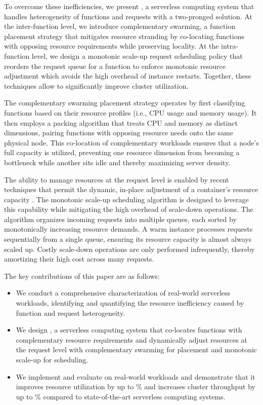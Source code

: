 To overcome these inefficiencies, we present \sysname, a serverless computing system that handles heterogeneity of functions and requests with a two-pronged solution. At the inter-function level, we introduce complementary swarming, a function placement strategy that mitigates resource stranding by co-locating functions with opposing resource requirements while preserving locality. At the intra-function level, we design a monotonic scale-up request scheduling policy that reorders the request queue for a function to enforce monotonic resource adjustment which avoids the high overhead of instance restarts. Together, these techniques allow \sysname to significantly improve cluster utilization.

The complementary swarming placement strategy operates by first classifying functions based on their resource profiles (i.e., CPU usage and memory usage). It then employs a packing algorithm that treats CPU and memory as distinct dimensions, pairing functions with opposing resource needs onto the same physical node. This co-location of complementary workloads ensures that a node's full capacity is utilized, preventing one resource dimension from becoming a bottleneck while another sits idle and thereby maximizing server density.

The ability to manage resources at the request level is enabled by recent techniques that permit the dynamic, in-place adjustment of a container's resource capacity . The monotonic scale-up scheduling algorithm is designed to leverage this capability while mitigating the high overhead of scale-down operations. The algorithm organizes incoming requests into multiple queues, each sorted by monotonically increasing resource demands. A warm instance processes requests sequentially from a single queue, ensuring its resource capacity is almost always scaled up. Costly scale-down operations are only performed infrequently, thereby amortizing their high cost across many requests.

The key contributions of this paper are as follows:
\begin{itemize}
    \item We conduct a comprehensive characterization of real-world serverless workloads, identifying and quantifying the resource inefficiency caused by function and request heterogeneity.
    \item We design \sysname, a serverless computing system that co-locates functions with complementary resource requirements and dynamically adjust resources at the request level with complementary swarming for placement and monotonic scale-up for scheduling.
    \item We implement and evaluate \sysname on real-world workloads and demonstrate that it improves resource utilization by up to \todo{}\% and increases cluster throughput by up to \todo{}\% compared to state-of-the-art serverless computing systems.
\end{itemize}

